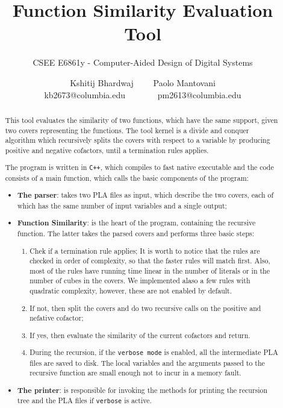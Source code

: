 \documentclass{acm_proc_article-sp}
\begin{document}
\title{Function Similarity Evaluation Tool}
\subtitle{CSEE E6861y - Computer-Aided Design of Digital Systems}

\author{
\alignauthor
Kshitij Bhardwaj \ \ \ \ Paolo Mantovani\\
{\small kb2673@columbia.edu \ \ \ \ \ \ \ pm2613@columbia.edu}
}

\maketitle

\begin{abstract}
This tool evaluates the similarity of two functions, which have the same support,
given two covers representing the functions. The tool kernel is a divide and
conquer algorithm which recursively splits the covers with respect to a variable
by producing positive and negative cofactors, until a termination rules applies.

The program is written in \texttt{C++}, which compiles to fast native executable
and the code consists of a main function, which calls the basic components of
the program:
\begin{itemize}
  \item {\bf The parser}: takes two PLA files as input, which describe the two
    covers, each of which has the same number of input variables and a single
    output;
  \item {\bf Function Similarity}: is the heart of the program, containing the
    recursive function. The latter takes the parsed covers and performs three
    basic steps:
    \begin{enumerate}
      \item Chek if a termination rule applies; It is worth to notice that the
        rules are checked in order of complexity, so that the faster rules will
        match first. Also, most of the rules have running time linear in the
        number of literals or in the number of cubes in the covers.
        We implemented alaso a few rules with quadratic complexity, however,
        these are not enabled by default.
      \item If not, then split the covers and do two recursive calls on the
        positive and nefative cofactor;
      \item If yes, then evaluate the similarity of the current cofactors and
        return.
      \item During the recursion, if the \texttt{verbose mode} is enabled, all
        the intermediate PLA files are saved to disk. The local variables and
        the arguments passed to the recursive function are small enough not to
        incur in a memory fault.
    \end{enumerate}
  \item {\bf The printer}: is responsible for invoking the methods for printing
    the recursion tree and the PLA files if \texttt{verbose} is active.
\end{itemize}

\end{abstract}
\end{document}
